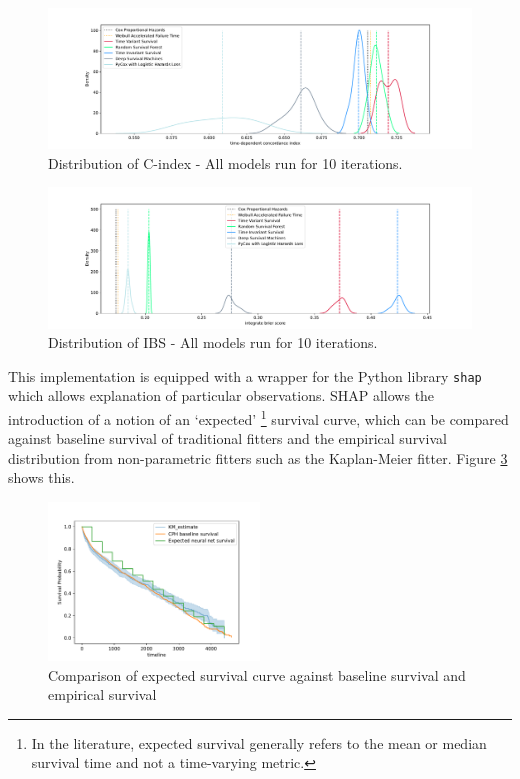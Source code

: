 \documentclass[%
 twocolumn,
 reprint,
 amsmath,amssymb,
 aps,nofootinbib
]{revtex4-2}
\begin{document}
\begin{figure}
  \centering
  \includegraphics[width=\textwidth]{cindex_score_dist_plot.pdf}
  \caption[C-Index distribution]{Distribution of C-index - All models run for 10 iterations.}
  \label{fig:cindex}
\end{figure}


\begin{figure}
  \centering
  \includegraphics[width=\textwidth]{ibs_dist_plot.pdf}
  \caption[IBS distribution]{Distribution of IBS - All models run for 10 iterations.}
  \label{fig:ibs}
\end{figure}

This implementation is equipped with a wrapper for the Python library \texttt{shap} which allows explanation of particular observations. SHAP allows the introduction of a notion of an `expected' \footnote{In the literature, expected survival generally refers to the mean or median survival time and not a time-varying metric.} survival curve, which can be compared against baseline survival of traditional fitters and the empirical survival distribution from non-parametric fitters such as the Kaplan-Meier fitter. Figure \ref{fig:comparing_surv_curve} shows this.\\

\begin{figure}
  \centering
  \includegraphics[width=0.5\textwidth]{comparing_surv_curve.pdf}
  \caption[Survival curve comparison]{Comparison of expected survival curve against baseline survival and empirical survival}
  \label{fig:comparing_surv_curve}
\end{figure}
\end{document}
